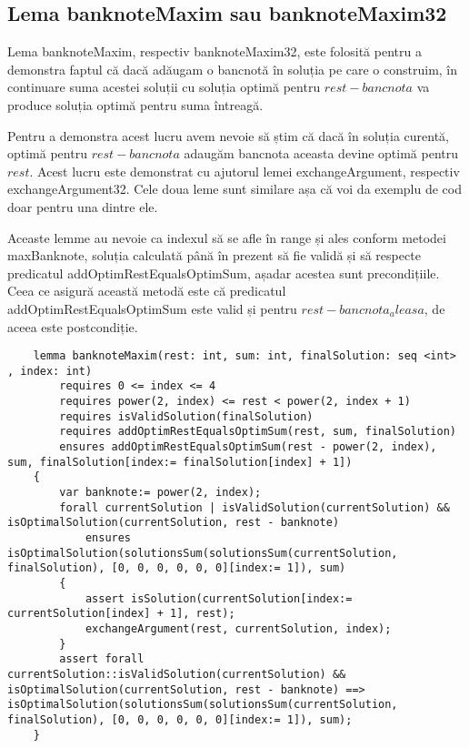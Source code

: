    \subsection{Lema banknoteMaxim sau banknoteMaxim32}
    Lema banknoteMaxim,  respectiv banknoteMaxim32, este folosită pentru a demonstra faptul că dacă adăugam o bancnotă în soluția pe care o 
    construim, în continuare suma acestei soluții cu soluția optimă pentru $ rest - bancnota$ va produce soluția 
    optimă pentru suma întreagă.\par
    Pentru a demonstra acest lucru avem nevoie să știm că dacă în soluția curentă, optimă pentru $ rest - bancnota$  
    adaugăm bancnota aceasta devine optimă pentru $rest$. Acest lucru este demonstrat cu ajutorul lemei exchangeArgument, respectiv exchangeArgument32.
    Cele doua leme sunt similare așa că voi da exemplu de cod doar pentru una dintre ele.\par
    Aceaste lemme au nevoie ca indexul să se afle în range și ales conform metodei maxBanknote, soluția calculată până 
    în prezent să fie validă și să respecte predicatul addOptimRestEqualsOptimSum, așadar acestea sunt precondițiile.
    Ceea ce asigură această metodă este că predicatul addOptimRestEqualsOptimSum este valid și pentru $rest - bancnota_aleasa$, 
    de aceea este postcondiție.
    \begin{lstlisting}
    lemma banknoteMaxim(rest: int, sum: int, finalSolution: seq <int> , index: int)
        requires 0 <= index <= 4
        requires power(2, index) <= rest < power(2, index + 1)
        requires isValidSolution(finalSolution)
        requires addOptimRestEqualsOptimSum(rest, sum, finalSolution)
        ensures addOptimRestEqualsOptimSum(rest - power(2, index), sum, finalSolution[index:= finalSolution[index] + 1]) 
    {
        var banknote:= power(2, index);
        forall currentSolution | isValidSolution(currentSolution) && isOptimalSolution(currentSolution, rest - banknote)
            ensures isOptimalSolution(solutionsSum(solutionsSum(currentSolution, finalSolution), [0, 0, 0, 0, 0, 0][index:= 1]), sum) 
        {
            assert isSolution(currentSolution[index:= currentSolution[index] + 1], rest);
            exchangeArgument(rest, currentSolution, index);
        }
        assert forall currentSolution::isValidSolution(currentSolution) && isOptimalSolution(currentSolution, rest - banknote) ==> isOptimalSolution(solutionsSum(solutionsSum(currentSolution, finalSolution), [0, 0, 0, 0, 0, 0][index:= 1]), sum);
    }
    \end{lstlisting}

